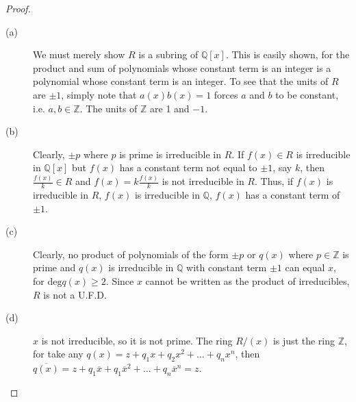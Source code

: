 \documentclass[12pt,leqno]{book}
\numberwithin{equation}{section}
\theoremstyle{definition}
\begin{document}
\begin{proof}\indent
 \begin{description}
  \item [(a)] We must merely show $R$ is a subring of $\mathbb{Q}[x]$. This is easily shown, for the product and sum of polynomials whose constant term is an integer is a polynomial whose constant term is an integer. To see that the units of $R$ are $\pm1$, simply note that $a(x)b(x)=1$ forces $a$ and $b$ to be constant, i.e. $a,b\in\mathbb{Z}$. The units of $\mathbb{Z}$ are 1 and $-1$.
  \item [(b)] Clearly, $\pm p$ where $p$ is prime is irreducible in $R$. If $f(x)\in R$ is irreducible in $\mathbb{Q}[x]$ but $f(x)$ has a constant term not equal to $\pm1$, say $k$, then $\frac{f(x)}{k}\in R$ and $f(x)=k\frac{f(x)}{k}$ is not irreducible in $R$. Thus, if $f(x)$ is irreducible in $R$, $f(x)$ is irreducible in $\mathbb{Q}$, $f(x)$ has a constant term of $\pm1$.
  \item [(c)] Clearly, no product of polynomials of the form $\pm p$ or $q(x)$ where $p\in\mathbb{Z}$ is prime and $q(x)$ is irreducible in $\mathbb{Q}$ with constant term $\pm1$ can equal $x$, for $\text{deg}q(x)\geq2$. Since $x$ cannot be written as the product of irreducibles, $R$ is not a U.F.D.
  \item [(d)] $x$ is not irreducible, so it is not prime. The ring $R/(x)$ is just the ring $\mathbb{Z}$, for take any $q(x)=z+q_1x+q_2x^2+\hdots+q_nx^n$, then $\overline{q(x)}=z+q_1\overline{x}+q_1\overline{x}^2+\hdots+q_n\overline{x}^n=z$.\qedhere
 \end{description}
\end{proof}
\end{document}
